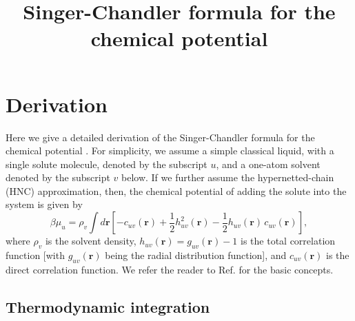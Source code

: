 \documentclass[12pt]{article}
\begin{document}
\newcommand{\vct}[1]{\mathbf{#1}}
\newcommand{\vr}{\vct{r}}
\newcommand{\vrN}{\mathbf{r}^N}
\newcommand{\vrn}{\mathbf{r}^n}
\newcommand{\vk}{\vct{k}}
\newcommand{\dvk}{\frac{ d \vk  }{(2\pi)^3}}
\newcommand{\FT}[1]{\tilde{#1}}
\newcommand{\FTc}{\FT{c}}
\newcommand{\FTh}{\FT{h}}

\newcommand{\plam}{\partial_\lambda}
\newcommand{\pbet}{\partial_\beta}



\title{Singer-Chandler formula for the chemical potential}
\date{}
\maketitle



\section{Derivation}

Here we give a detailed derivation of the Singer-Chandler formula
  for the chemical potential \cite{singer}.
%
For simplicity, we assume a simple classical liquid,
  with a single solute molecule, denoted by the subscript $u$,
  and a one-atom solvent denoted by the subscript $v$ below.
%
If we further assume the hypernetted-chain (HNC) approximation,
then, the chemical potential of adding the solute into
  the system is given by
%
\begin{equation}
\beta \mu_u
  =
  \rho_v \int d\vr
  \left[
    - c_{uv}(\vr)
    + \frac{1}{2} h_{uv}^2(\vr)
    - \frac{1}{2} h_{uv}(\vr) \, c_{uv}(\vr)
  \right],
  \label{eq:singer}
\end{equation}
%
where $\rho_v$ is the solvent density,
  $h_{uv}(\vr) = g_{uv}(\vr) - 1$ is the total correlation function
  [with $g_{uv}(\vr)$ being the radial distribution function],
and $c_{uv}(\vr)$ is the direct correlation function.
We refer the reader to Ref. \cite{hansen}
  for the basic concepts.
%



\subsection{Thermodynamic integration}
\end{document}
